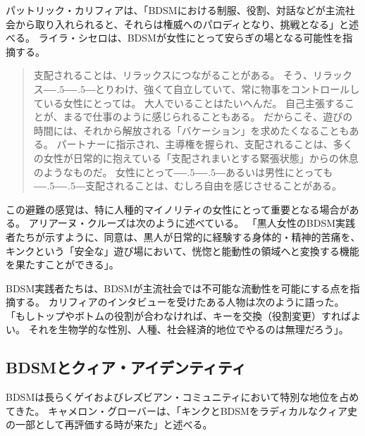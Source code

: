 \documentclass[paper=a4,book,openany]{jlreq}
\def\DDASH{―\kern-.5\zw―\kern-.5\zw―} %
\begin{document}
パットリック・カリフィアは、「BDSMにおける制服、役割、対話などが主流社会から取り入れられると、それらは権威へのパロディとなり、挑戦となる」と述べる\citep{califia79:_unrav_sexual_fring}。
ライラ・シセロは、BDSMが女性にとって安らぎの場となる可能性を指摘する。

\begin{quote}
  支配されることは、リラックスにつながることがある。
そう、リラックス{\DDASH}とりわけ、強くて自立していて、常に物事をコントロールしている女性にとっては。
大人でいることはたいへんだ。
自己主張することが、まるで仕事のように感じられることもある。
だからこそ、遊びの時間には、それから解放される「バケーション」を求めたくなることもある。
パートナーに指示され、主導権を握られ、支配されることは、多くの女性が日常的に抱えている「支配されまいとする緊張状態」からの休息のようなものだ。
女性にとって{\DDASH}あるいは男性にとっても{\DDASH}支配されることは、むしろ自由を感じさせることがある。
\citep{cicero12:_six_myths_kink_bdsm}
\end{quote}

この避難の感覚は、特に人種的マイノリティの女性にとって重要となる場合がある。
アリアーヌ・クルーズは次のように述べている。
「黒人女性のBDSM実践者たちが示すように、同意は、黒人が日常的に経験する身体的・精神的苦痛を、キンクという「安全な」遊び場において、恍惚と能動性の領域へと変換する機能を果たすことができる」\citep{wachter-grene16:_conver_arian_cruz}。

BDSM実践者たちは、BDSMが主流社会では不可能な流動性を可能にする点を指摘する。
カリフィアのインタビューを受けたある人物は次のように語った。
「もしトップやボトムの役割が合わなければ、キーを交換（役割変更）すればよい。
それを生物学的な性別、人種、社会経済的地位でやるのは無理だろう」\citep[pp. 173-174]{califia00:_public_sex}。

\subsection{BDSMとクィア・アイデンティティ}

BDSMは長らくゲイおよびレズビアン・コミュニティにおいて特別な地位を占めてきた。
キャメロン・グローバーは、「キンクとBDSMをラディカルなクィア史の一部として再評価する時が来た」と述べる\citep{glover18:_its_time_recen_kink_bdsm}。
\end{document}
